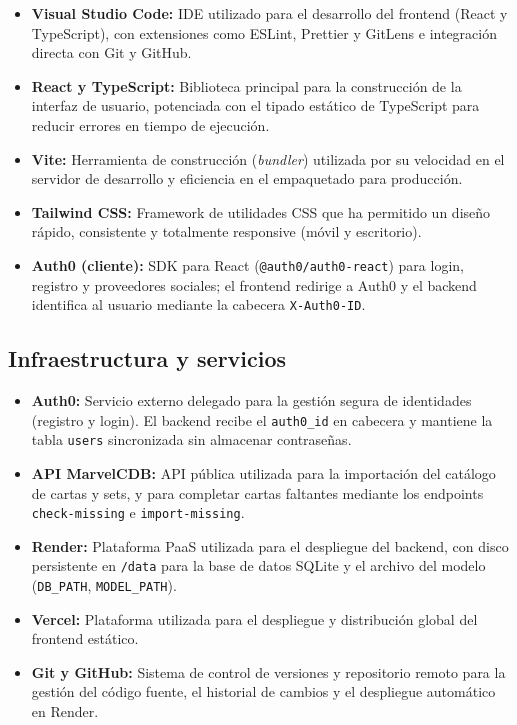 \begin{itemize}
    \item \textbf{Visual Studio Code:} IDE utilizado para el desarrollo del frontend (React y TypeScript), con extensiones como ESLint, Prettier y GitLens e integración directa con Git y GitHub.
    \item \textbf{React y TypeScript:} Biblioteca principal para la construcción de la interfaz de usuario, potenciada con el tipado estático de TypeScript para reducir errores en tiempo de ejecución.
    \item \textbf{Vite:} Herramienta de construcción (\textit{bundler}) utilizada por su velocidad en el servidor de desarrollo y eficiencia en el empaquetado para producción.
    \item \textbf{Tailwind CSS:} Framework de utilidades CSS que ha permitido un diseño rápido, consistente y totalmente responsive (móvil y escritorio).
    \item \textbf{Auth0 (cliente):} SDK para React (\texttt{@auth0/auth0-react}) para login, registro y proveedores sociales; el frontend redirige a Auth0 y el backend identifica al usuario mediante la cabecera \texttt{X-Auth0-ID}.
\end{itemize}

\subsection{Infraestructura y servicios}

\begin{itemize}
    \item \textbf{Auth0:} Servicio externo delegado para la gestión segura de identidades (registro y login). El backend recibe el \texttt{auth0\_id} en cabecera y mantiene la tabla \texttt{users} sincronizada sin almacenar contraseñas.
    \item \textbf{API MarvelCDB:} API pública utilizada para la importación del catálogo de cartas y sets, y para completar cartas faltantes mediante los endpoints \texttt{check-missing} e \texttt{import-missing}.
    \item \textbf{Render:} Plataforma PaaS utilizada para el despliegue del backend, con disco persistente en \texttt{/data} para la base de datos SQLite y el archivo del modelo (\texttt{DB\_PATH}, \texttt{MODEL\_PATH}).
    \item \textbf{Vercel:} Plataforma utilizada para el despliegue y distribución global del frontend estático.
    \item \textbf{Git y GitHub:} Sistema de control de versiones y repositorio remoto para la gestión del código fuente, el historial de cambios y el despliegue automático en Render.
\end{itemize}
